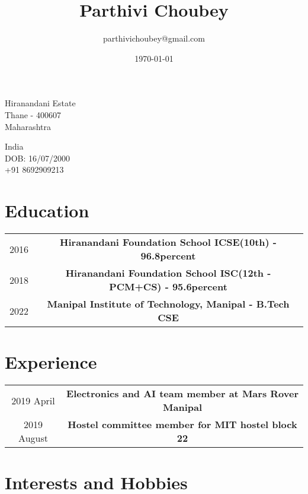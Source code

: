 \documentclass[10pt]{article}
\title{\bfseries\Huge Parthivi Choubey}
\author{parthivichoubey@gmail.com}
\date{\today}
\begin{document}
	\begin{minipage}{0.65\textwidth}
		\begingroup
		\let\center\flushleft
		\let\endcenter\endflushleft
		\maketitle
		\endgroup
	\end{minipage}
\begin{minipage}{0.3\textwidth}
	\flushright{\rule{3.5cm}{4.5cm}}
\end{minipage}

\begin{minipage}[ht]{0.48\textwidth}
	Hiranandani Estate\\
	Thane - 400607\\
	Maharashtra\\
\end{minipage}
\begin{minipage}[ht]{0.48\textwidth}
	India\\
	DOB: 16/07/2000\\
	+91 8692909213\\
\end{minipage}

\section*{Education}
\begin{tabular}{c|c}
	\hline
	2016&{\bf Hiranandani Foundation School ICSE(10th) - 96.8percent}\\
	2018&{\bf Hiranandani Foundation School ISC(12th - PCM+CS) - 95.6percent}\\
	2022&{\bf Manipal Institute of Technology, Manipal - B.Tech CSE}\\
\end{tabular}

\section*{Experience}
\begin{tabular}{c|c}
	\hline
	2019 April&{\bf Electronics and AI team member at Mars Rover Manipal}\\
	2019 August&{\bf Hostel committee member for MIT hostel block 22}\\
\end{tabular}

\section{Interests and Hobbies}
\end{document}
